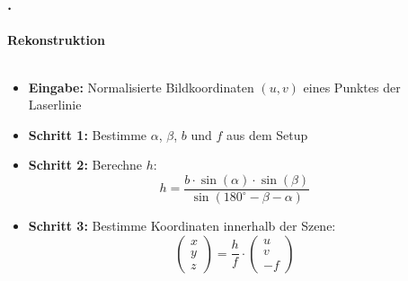 \documentclass[xcolor=dvipsnames]{beamer}
\def\frametitlesec{\frametitle{\arabic{section}.\hspace{0.5ex}\insertsection}}
\def\framesubtitles#1{\framesubtitle{\hspace{3.5ex}#1}}
\begin{document}
\begin{frame}
	\frametitlesec
	\framesubtitles{Rekonstruktion}

	\begin{columns}
		\small
		\begin{column}{.61\linewidth}
			\begin{itemize}
				\item<1-> \textbf{Eingabe:} Normalisierte Bildkoordinaten $(u,v)$ eines Punktes der Laserlinie
				\item<2-> \textbf{Schritt 1:} Bestimme $\alpha$, $\beta$, $b$ und $f$ aus dem Setup
				\item<3-> \textbf{Schritt 2:} Berechne $h$:
				\[h = \frac{b \cdot \sin(\alpha) \cdot \sin(\beta)}{\sin(180^\circ - \beta - \alpha)}\]
				\item<4-> \textbf{Schritt 3:} Bestimme Koordinaten innerhalb der Szene:
				\[\begin{pmatrix}x\\y\\z\end{pmatrix} = \frac{h}{f} \cdot
				\begin{pmatrix}u\\v\\-f\end{pmatrix}\]
			\end{itemize}
		\end{column}
		\begin{column}{.39\linewidth}
\end{column}
\end{columns}
\end{frame}
\end{document}
